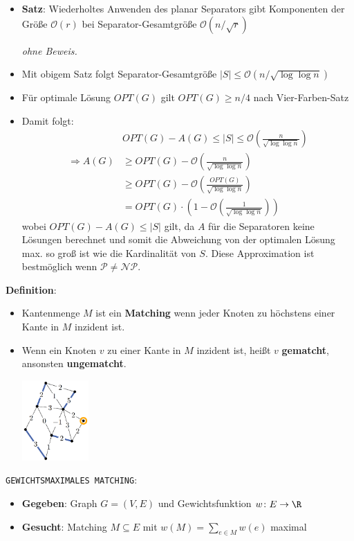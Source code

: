 \begin{itemize}
	\item \textbf{Satz}: Wiederholtes Anwenden des planar Separators gibt Komponenten der Größe $\mathcal{O}(r)$ bei Separator-Gesamtgröße $\mathcal{O}(n/\sqrt{r})$
	
	\textit{ohne Beweis.}
	
	\item Mit obigem Satz folgt Separator-Gesamtgröße $|S|\leq\mathcal{O}(n/\sqrt{\log\log n})$
	\item Für optimale Lösung $OPT(G)$ gilt $OPT(G)\geq n/4$ nach Vier-Farben-Satz
	\item Damit folgt:
	$$
	\begin{aligned}
		& OPT(G)-A(G) \leq|S| \leq \mathcal{O}\left(\frac{n}{\sqrt{\log \log n}}\right) \\
		\Rightarrow A(G) & \geq OPT(G)-\mathcal{O}\left(\frac{n}{\sqrt{\log \log n}}\right) \\
		& \geq OPT(G)-\mathcal{O}\left(\frac{OPT(G)}{\sqrt{\log \log n}}\right) \\
		& =OPT(G) \cdot\left(1-\mathcal{O}\left(\frac{1}{\sqrt{\log \log n}}\right)\right)
	\end{aligned}
	$$
	wobei $OPT(G)-A(G) \leq|S|$ gilt, da $A$ für die Separatoren keine Lösungen berechnet und somit die Abweichung von der optimalen Lösung max. so groß ist wie die Kardinalität von $S$. Diese Approximation ist bestmöglich wenn $\mathcal{P}\neq\mathcal{NP}$.
\end{itemize}
\bigskip
\textbf{Definition}:
\begin{itemize}
	\item Kantenmenge $M$ ist ein \textbf{Matching} wenn jeder Knoten zu höchstens einer Kante in $M$ inzident ist.
	\item Wenn ein Knoten $v$ zu einer Kante in $M$ inzident ist, heißt $v$ \textbf{gematcht}, ansonsten \textbf{ungematcht}.
	\begin{center}
		\includegraphics[width=0.2\textwidth]{images/matching.png}
	\end{center}
\end{itemize}
\bigskip
\texttt{GEWICHTSMAXIMALES MATCHING}: 
\begin{itemize}
	\item \textbf{Gegeben}: Graph $G=(V,E)$ und Gewichtsfunktion $w\colon E\rightarrow\R$
	\item \textbf{Gesucht}: Matching $M\subseteq E$ mit $w(M)=\sum\limits_{e\in M} w(e)$ maximal
\end{itemize}
